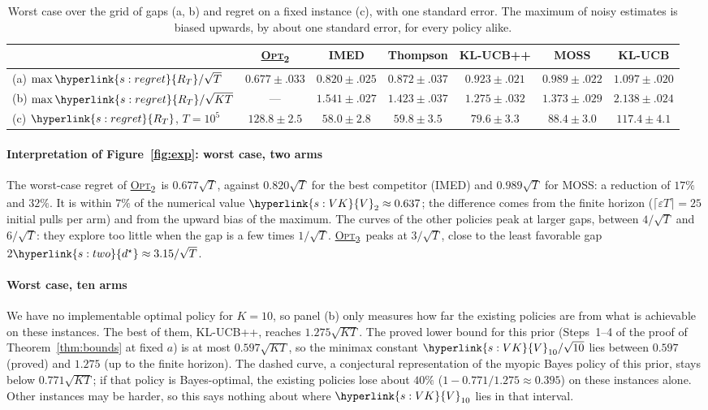 \documentclass[11pt]{article}
\DeclareRobustCommand{\sy}[2]{{\hyperlink{#1}{#2}}}
\newcommand{\1}{\mathbf{1}}
\newcommand{\RT}{\sy{s:regret}{R_T}}
\newcommand{\VK}{\sy{s:VK}{V}}
\newcommand{\OPT}{\sy{alg:opt}{\textsc{Opt}\textsubscript{2}}}
\newcommand{\dst}{\sy{s:two}{d^\star}}
\begin{document}
\begin{table}[h]\centering\footnotesize\setlength{\tabcolsep}{4pt}
\begin{tabular}{@{}lcccccc@{}}
\toprule
 & \OPT & IMED & Thompson & KL-UCB++ & MOSS & KL-UCB\\ \midrule
(a) $\max\RT/\sqrt T$ & $\mathbf{0.677}\pm.033$ & $0.820\pm.025$ & $0.872\pm.037$ & $0.923\pm.021$ & $0.989\pm.022$ & $1.097\pm.020$\\
(b) $\max\RT/\sqrt{KT}$ & --- & $1.541\pm.027$ & $1.423\pm.037$ & $\mathbf{1.275}\pm.032$ & $1.373\pm.029$ & $2.138\pm.024$\\
(c) $\RT$, $T=10^5$ & $128.8\pm2.5$ & $\mathbf{58.0}\pm2.8$ & $59.8\pm3.5$ & $79.6\pm3.3$ & $88.4\pm3.0$ & $117.4\pm4.1$\\
\bottomrule
\end{tabular}
\caption{Worst case over the grid of gaps (a, b) and regret on a fixed instance (c), with one standard error. The maximum of noisy estimates is biased upwards, by about one
standard error, for every policy alike.}\label{tab:exp}
\end{table}

\paragraph{Interpretation of Figure~\ref{fig:exp}: worst case, two arms} The worst-case regret of \OPT\ is $0.677\sqrt T$, against $0.820\sqrt T$ for the best competitor (IMED) and $0.989\sqrt T$ for MOSS: a reduction
of $17\%$ and $32\%$. It is within $7\%$ of the numerical value $\VK_2\approx0.637$; the difference comes from the finite horizon ($\lceil\varepsilon T\rceil=25$ initial
pulls per arm) and from the upward bias of the maximum. The curves of the other policies peak at larger gaps, between $4/\sqrt T$ and $6/\sqrt T$: they explore too
little when the gap is a few times $1/\sqrt T$. \OPT\ peaks at $3/\sqrt T$, close to the least favorable gap $2\dst\approx3.15/\sqrt T$.

\paragraph{Worst case, ten arms} We have no implementable optimal policy for $K=10$, so panel (b) only measures how far the existing policies are from what is achievable on
these instances. The best of them, KL-UCB++, reaches $1.275\sqrt{KT}$. The proved lower bound for this prior (Steps~1--4 of the proof of
Theorem~\ref{thm:bounds} at fixed $a$) is at most $0.597\sqrt{KT}$, so the minimax constant $\VK_{10}/\sqrt{10}$ lies between $0.597$ (proved) and $1.275$
(up to the finite horizon). The dashed curve, a conjectural representation of the myopic Bayes policy of this prior, stays below $0.771\sqrt{KT}$; if
that policy is Bayes-optimal, the existing policies lose about $40\%$ ($1-0.771/1.275\approx0.395$) on these instances alone. Other instances may be
harder, so this says nothing about where $\VK_{10}$ lies in that interval.
\end{document}
